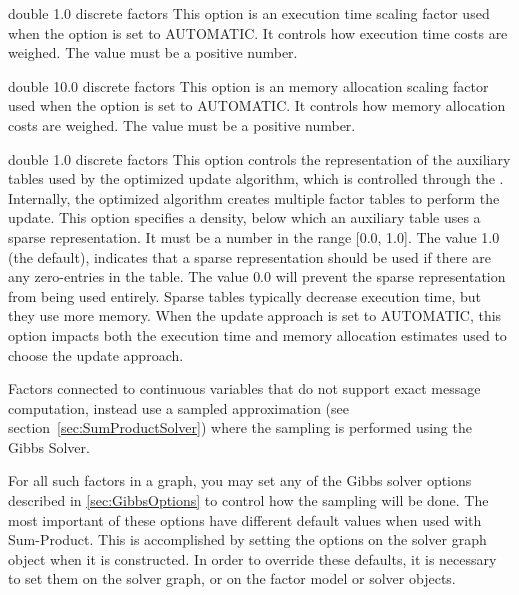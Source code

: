 
{double}
{1.0}
{discrete factors}
{This option is an execution time scaling factor used when the  option is set to AUTOMATIC. It controls how execution time costs are weighed. The value must be a positive number.}


{double}
{10.0}
{discrete factors}
{This option is an memory allocation scaling factor used when the  option is set to AUTOMATIC. It controls how memory allocation costs are weighed. The value must be a positive number.}


{double}
{1.0}
{discrete factors}
{This option controls the representation of the auxiliary tables used by the optimized update algorithm, which is controlled through the . Internally, the optimized algorithm creates multiple factor tables to perform the update. This option specifies a density, below which an auxiliary table uses a sparse representation. It must be a number in the range [0.0, 1.0]. The value 1.0 (the default), indicates that a sparse representation should be used if there are any zero-entries in the table. The value 0.0 will prevent the sparse representation from being used entirely. Sparse tables typically decrease execution time, but they use more memory. When the update approach is set to AUTOMATIC, this option impacts both the execution time and memory allocation estimates used to choose the update approach.}


Factors connected to continuous variables that do not support exact message computation, instead use a sampled approximation (see section~\ref{sec:SumProductSolver}) where the sampling is performed using the Gibbs Solver.

For all such factors in a graph, you may set any of the Gibbs solver options described in \autoref{sec:GibbsOptions} to control how the sampling will be done. The most important of these options have different default values when used with Sum-Product. This is accomplished by setting the options on the solver graph object when it is constructed. In order to override these defaults, it is necessary to set them on the solver graph, or on the factor model or solver objects.

